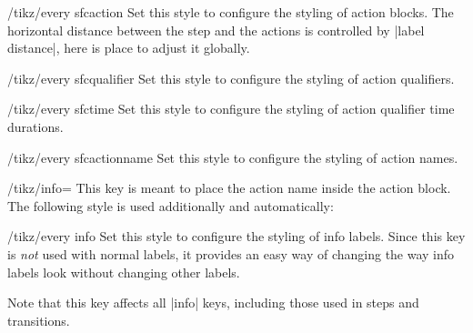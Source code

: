 \documentclass[a4paper]{ltxdoc}
\begin{document}
\begin{stylekey}{/tikz/every sfcaction}
  Set this style to configure the styling of action blocks. The horizontal distance between the step and the actions is controlled by |label distance|, here is place to adjust it globally.
\end{stylekey}

\begin{stylekey}{/tikz/every sfcqualifier}
  Set this style to configure the styling of action qualifiers.
\end{stylekey}

\begin{stylekey}{/tikz/every sfctime}
  Set this style to configure the styling of action qualifier time durations.
\end{stylekey}

\begin{stylekey}{/tikz/every sfcactionname}
  Set this style to configure the styling of action names.
\end{stylekey}

\begin{key}{/tikz/info=}
  This key is meant to place the action name inside the action block. The following style is used additionally and automatically:
  \begin{stylekey}{/tikz/every info}
    Set this style to configure the styling of info labels. Since this
    key is \emph{not} used with normal labels, it provides an easy way
    of changing the way info labels look without changing other
    labels.
  \end{stylekey}
  Note that this key affects all |info| keys, including those used in steps and transitions.
\end{key}
\end{document}
